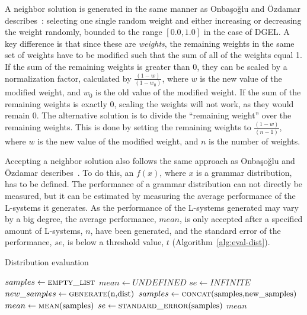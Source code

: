 A neighbor solution is generated in the same manner as Onbaşoğlu and Özdamar describes~\cite{2001Onbasoglu}: selecting one single random weight and either increasing or decreasing the weight randomly, bounded to the range $[0.0, 1.0]$ in the case of \gls{DGEL}.
A key difference is that since these are \textit{weights}, the remaining weights in the same set of weights have to be modified such that the sum of all of the weights equal 1.
If the sum of the remaining weights is greater than 0, they can be scaled by a normalization factor, calculated by $\frac{(1 - w)}{(1 - w_0)}$, where $w$ is the new value of the modified weight, and $w_0$ is the old value of the modified weight.
If the sum of the remaining weights is exactly 0, scaling the weights will not work, as they would remain 0.
The alternative solution is to divide the ``remaining weight'' over the remaining weights.
This is done by setting the remaining weights to $\frac{(1 - w)}{(n - 1)}$, where $w$ is the new value of the modified weight, and $n$ is the number of weights.

Accepting a neighbor solution also follows the same approach as Onbaşoğlu and Özdamar describes~\cite{2001Onbasoglu}.
To do this, an $f(x)$, where $x$ is a grammar distribution, has to be defined.
The performance of a grammar distribution can not directly be measured, but it can be estimated by measuring the average performance of the \glspl{L-system} it generates.
As the performance of the \glspl{L-system} generated may vary by a big degree, the average performance, $mean$, is only accepted after a specified amount of \glspl{L-system}, $n$, have been generated, and the standard error of the performance, $se$, is below a threshold value, $t$ (Algorithm~\ref{alg:eval-dist}).

\begin{algorithm}
\caption{Distribution evaluation}
\label{alg:eval-dist}
\begin{algorithmic}
    \State $samples\gets \Call{empty\_list}{}$
    \State $mean\gets UNDEFINED$
    \State $se\gets INFINITE$
        \State $new\_samples\gets \Call{generate}{$n$, $dist$}$
        \State $samples\gets \Call{concat}{$samples$, $new\_samples$}$
        \State $mean\gets \Call{mean}{$samples$}$
        \State $se\gets \Call{standard\_error}{$samples$}$
    \EndWhile
    \State \Return $mean$
\EndFunction
\end{algorithmic}
\end{algorithm}

